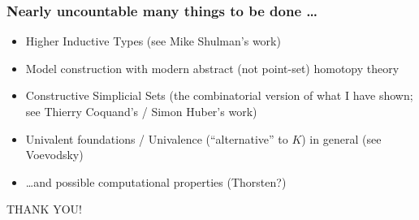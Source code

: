 \documentclass[12pt, mathserif]{beamer}
\begin{document}
\begin{frame}
\frametitle{Nearly uncountable many things to be done \ldots}
\begin{itemize}
\item Higher Inductive Types (see Mike Shulman's work)
\item Model construction with modern abstract (not point-set) homotopy theory
\item Constructive Simplicial Sets (the combinatorial version of what I have shown; see Thierry Coquand's / Simon Huber's work)
\item Univalent foundations / Univalence (``alternative'' to $K$) in general (see Voevodsky)
\item \ldots and possible computational properties (Thorsten?)
\end{itemize}

\begin{center}
THANK YOU!
\end{center}
\end{frame}
\end{document}
